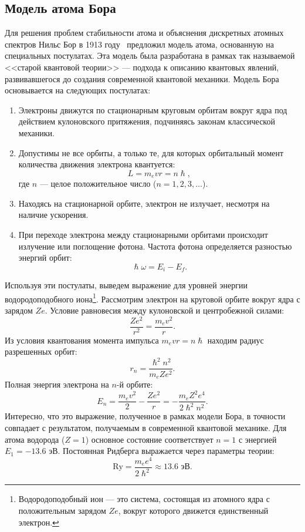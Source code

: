 \documentclass[a4paper, 12pt]{article}
\begin{document}
\subsection{Модель атома Бора}
Для решения проблем стабильности атома и объяснения дискретных атомных спектров
Нильс Бор в 1913 году~\cite{Bohr1913} предложил модель атома, основанную на специальных
постулатах. Эта модель была разработана в рамках так называемой <<старой
квантовой теории>> — подхода к описанию квантовых явлений, развивавшегося до
создания современной квантовой механики. Модель Бора основывается на следующих
постулатах:
\begin{enumerate}
\item Электроны движутся по стационарным круговым орбитам вокруг ядра под действием
  кулоновского притяжения, подчиняясь законам классической механики.
\item Допустимы не все орбиты, а только те, для которых орбитальный момент
  количества движения электрона квантуется:
\begin{equation}
L = m_evr = n\hslash,
\end{equation}
где $n$ --- целое положительное число ($n = 1, 2, 3, \ldots$).
\item Находясь на стационарной орбите, электрон не излучает, несмотря на наличие ускорения.
\item При переходе электрона между стационарными орбитами происходит излучение или
  поглощение фотона. Частота фотона определяется разностью энергий орбит:
\begin{equation}
\hslash\omega = E_i - E_f.
\end{equation}
\end{enumerate}

Используя эти постулаты, выведем выражение для уровней энергии водородоподобного
иона\footnote{Водородоподобный ион --- это система, состоящая из атомного ядра с
  положительным зарядом $Ze$, вокруг которого движется единственный электрон.}.
Рассмотрим электрон на круговой орбите вокруг ядра с зарядом $Ze$. Условие
равновесия между кулоновской и центробежной силами:
\begin{equation}
\frac{Ze^2}{r^2} = \frac{m_ev^2}{r}.
\end{equation}
Из условия квантования момента импульса $m_evr = n\hslash$ находим радиус разрешенных орбит:
\begin{equation}
r_n = \frac{\hslash^2n^2}{m_eZe^2}.
\end{equation}
Полная энергия электрона на $n$-й орбите:
\begin{equation}
E_n = \frac{m_ev^2}{2} - \frac{Ze^2}{r} = -\frac{m_eZ^2e^4}{2\hslash^2n^2}.
\end{equation}
Интересно, что это выражение, полученное в рамках модели Бора, в точности
совпадает с результатом, получаемым в современной квантовой механике.
Для атома водорода ($Z=1$) основное состояние соответствует $n=1$ с энергией
$E_1 = -13.6$ эВ. Постоянная Ридберга выражается через параметры теории:
\begin{equation}
\text{Ry} = \frac{m_ee^4}{2\hslash^2} \approx 13.6\text{ эВ}.
\end{equation}
\end{document}
